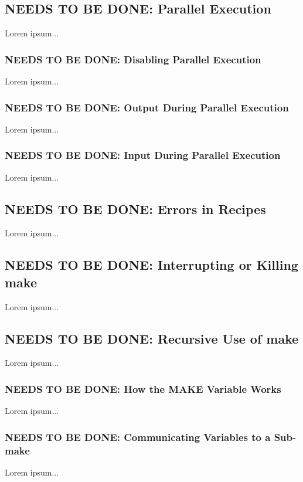\documentclass{charun}
\begin{document}
\begin{multicols*}{2}
\color{gray}
\subsection{NEEDS TO BE DONE: Parallel Execution}
Lorem ipsum...
\color{black}

\color{gray}
\subsubsection{NEEDS TO BE DONE: Disabling Parallel Execution}
Lorem ipsum...
\color{black}

\color{gray}
\subsubsection{NEEDS TO BE DONE: Output During Parallel Execution}
Lorem ipsum...
\color{black}

\color{gray}
\subsubsection{NEEDS TO BE DONE: Input During Parallel Execution}
Lorem ipsum...
\color{black}

\color{gray}
\subsection{NEEDS TO BE DONE: Errors in Recipes}
Lorem ipsum...
\color{black}

\color{gray}
\subsection{NEEDS TO BE DONE: Interrupting or Killing make}
Lorem ipsum...
\color{black}

\color{gray}
\subsection{NEEDS TO BE DONE: Recursive Use of make}
Lorem ipsum...
\color{black}

\color{gray}
\subsubsection{NEEDS TO BE DONE: How the MAKE Variable Works}
Lorem ipsum...
\color{black}

\color{gray}
\subsubsection{NEEDS TO BE DONE: Communicating Variables to a Sub-make}
Lorem ipsum...
\color{black}


\end{multicols*}
\end{document}
